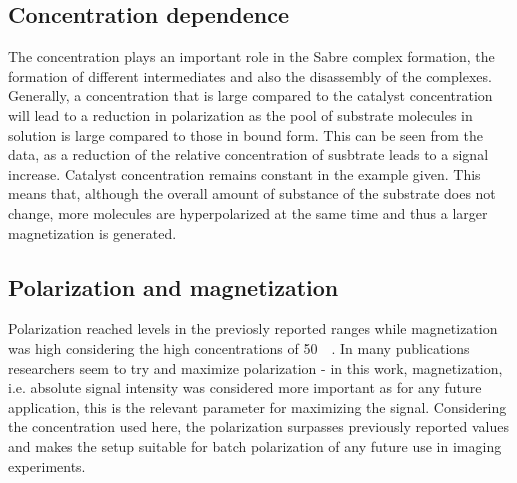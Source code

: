         \subsection{Concentration dependence}
            The concentration plays an important role in the Sabre complex formation, the formation of different intermediates and also the disassembly of the complexes. Generally, a concentration that is large compared to the catalyst concentration will lead to a reduction in polarization as the pool of substrate molecules in solution is large compared to those in bound form. This can be seen from the data, as a reduction of the relative concentration of susbtrate leads to a signal increase. Catalyst concentration remains constant in the example given. This means that, although the overall amount of substance of the substrate does not change, more molecules are hyperpolarized at the same time and thus a larger magnetization is generated.
        \subsection{Polarization and magnetization}
            Polarization reached levels in the previosly reported ranges while magnetization was high considering the high concentrations of \SI{50}{\milli\molar}. In many publications researchers seem to try and maximize polarization - in this work, magnetization, i.e. absolute signal intensity was considered more important as for any future application, this is the relevant parameter for maximizing the signal. Considering the concentration used here, the polarization surpasses previously reported values and makes the setup suitable for batch polarization of any future use in imaging experiments.
